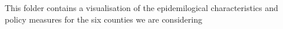 This folder contains a visualisation of the epidemilogical characteristics and policy measures for the six counties we are considering 
